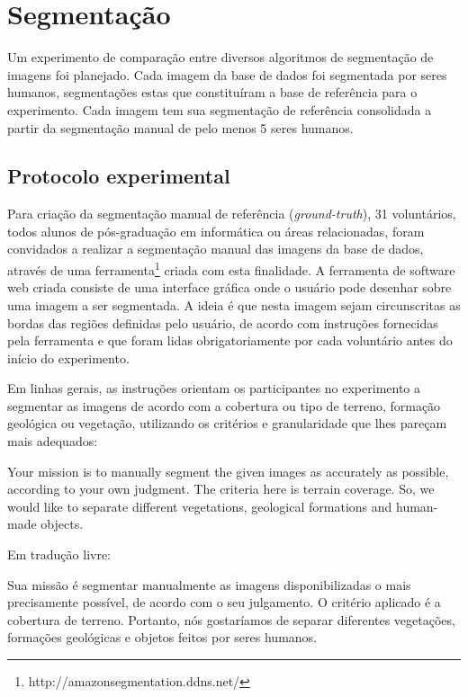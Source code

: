 \section{Segmentação}

Um experimento de comparação entre diversos algoritmos de segmentação de imagens foi planejado. Cada imagem da base de dados foi segmentada por seres humanos, segmentações estas que constituíram a base de referência para o experimento. Cada imagem tem sua segmentação de referência consolidada a partir da segmentação manual de pelo menos 5 seres humanos.

\subsection{Protocolo experimental}

Para criação da segmentação manual de referência (\textit{ground-truth}), 31 voluntários, todos alunos de pós-graduação em informática ou áreas relacionadas, foram convidados a realizar a segmentação manual das imagens da base de dados, através de uma ferramenta\footnote{http://amazonsegmentation.ddns.net/} criada com esta finalidade. A ferramenta de software web criada consiste de uma interface gráfica onde o usuário pode desenhar sobre uma imagem a ser segmentada. A ideia é que nesta imagem sejam circunscritas as bordas das regiões definidas pelo usuário, de acordo com instruções fornecidas pela ferramenta e que foram lidas obrigatoriamente por cada voluntário antes do início do experimento.

Em linhas gerais, as instruções orientam os participantes no experimento a segmentar as imagens de acordo com a cobertura ou tipo de terreno, formação geológica ou vegetação, utilizando os critérios e granularidade que lhes pareçam mais adequados:

\begin{citacao}[english]
Your mission is to manually segment the given images as accurately as possible, according to your own judgment. The criteria here is terrain coverage. So, we would like to separate different vegetations, geological formations and human-made objects. \cite{amazonsegmentation}
\end{citacao}

Em tradução livre:

\begin{citacao}
Sua missão é segmentar manualmente as imagens disponibilizadas o mais precisamente possível, de acordo com o seu julgamento. O critério aplicado é a cobertura de terreno. Portanto, nós gostaríamos de separar diferentes vegetações, formações geológicas e objetos feitos por seres humanos. \cite{amazonsegmentation}
\end{citacao}

